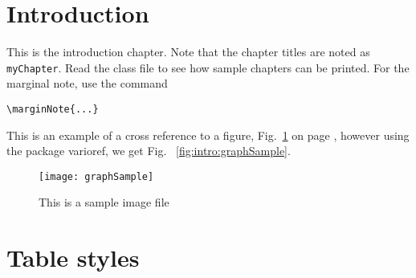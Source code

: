  \label{chap:intro}
\section{Introduction}
\nobreak
This is the introduction chapter.  Note that the chapter titles are noted as \texttt{myChapter}. Read the class file to see how sample chapters can be printed. For the marginal note, use the command 
\begin{verbatim}
\marginNote{...}
\end{verbatim}

This is an example of a cross reference to a figure, Fig.~\ref{fig:intro:graphSample} on page \pageref{fig:intro:graphSample}, however using the package varioref, we get Fig.~		\vref{fig:intro:graphSample}.

\begin{figure}[ht] %
   \centering
   \texttt{[image: graphSample]} 
   \caption[Sample image]{This is a sample image file}
   \label{fig:intro:graphSample}
\end{figure}

\newpage{}
\section{Table styles}

